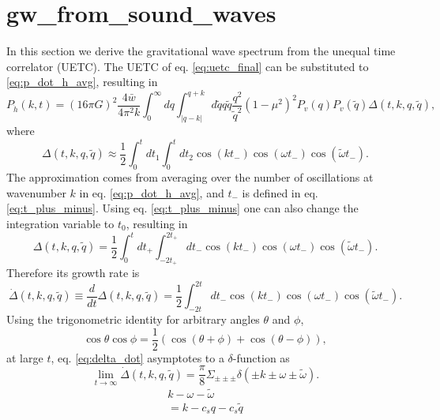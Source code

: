 \section{gw_from_sound_waves}
In this section we derive the gravitational wave spectrum from the unequal time correlator (UETC).
The UETC of eq. \eqref{eq:uetc_final} can be substituted to \eqref{eq:p_dot_h_avg},
resulting in
\cite[eq. 3.35]{hindmarsh_gw_pt_2019}
\begin{equation}
P_{\dot{h}} (k,t) = (16 \pi G)^2 \frac{4 \bar{w}}{4\pi^2 k}
\int_0^\infty dq \int_{|q-k|}^{q+k} d\tilde{q} q \tilde{q} \frac{q^2}{\tilde{q}^2} (1-\mu^2)^2
P_v(q) P_v(\tilde{q}) \Delta(t,k,q,\tilde{q}),
\end{equation}
where
\begin{equation}
\Delta(t,k,q,\tilde{q}) \approx \frac{1}{2} \int_0^t dt_1 \int_0^t dt_2 \cos(kt_-)\cos(\omega t_-)\cos(\tilde{\omega}t_-).
\end{equation}
The approximation comes from averaging over the number of oscillations at wavenumber $k$ in eq. \eqref{eq:p_dot_h_avg},
and $t_-$ is defined in eq. \eqref{eq:t_plus_minus}.
Using eq. \eqref{eq:t_plus_minus} one can also change the integration variable to $t_0$, resulting in
\begin{equation}
\Delta(t,k,q,\tilde{q}) = \frac{1}{2} \int_0^t dt_+ \int_{-2t_+}^{2t_+} dt_- \cos(kt_-) \cos(\omega t_-) \cos(\tilde{\omega} t_-).
\end{equation}
Therefore its growth rate is
\begin{equation}
\dot{\Delta}(t,k,q,\tilde{q}) \equiv \frac{d}{dt} \Delta(t,k,q,\tilde{q}) = \frac{1}{2} \int_{-2t}^{2t} dt_- \cos(kt_-) \cos(\omega t_-) \cos(\tilde{\omega} t_-).
\label{eq:delta_dot}
\end{equation}
Using the trigonometric identity for arbitrary angles $\theta$ and $\phi$,
\begin{equation}
\cos \theta \cos \phi = \frac{1}{2} \left( \cos(\theta + \phi) + \cos(\theta - \phi) \right),
\end{equation}
at large $t$, eq. \eqref{eq:delta_dot} asymptotes to a $\delta$-function as
\begin{equation}
\lim_{t\rightarrow\infty} \dot{\Delta}(t,k,q,\tilde{q}) = \frac{\pi}{8} \Sigma_{\pm\pm\pm} \delta(\pm k \pm \omega \pm \tilde{\omega}).
\end{equation}
\iffalse
\begin{align}
k - \omega - \tilde{\omega} \\
= k - c_s q - c_s \tilde{q} \\
\end{align}
